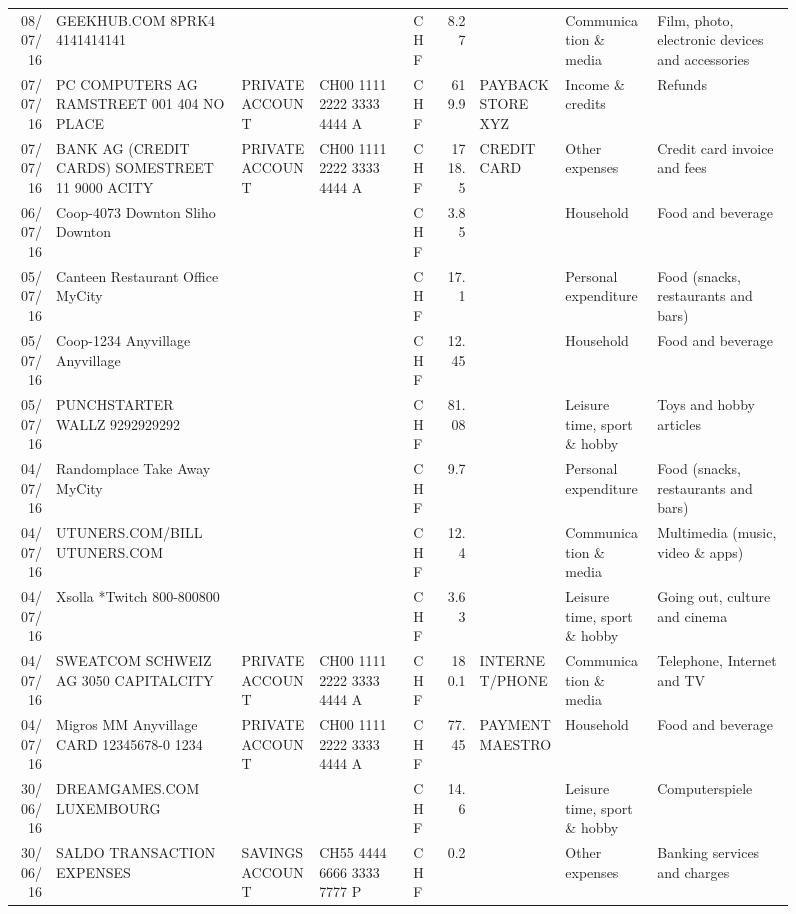 \begin{landscape}
\begin{sidewaysfigure}
\begin{table}[h]
\begin{center}
\begin{tabular}{rllllrlll}
		08/07/16 & GEEKHUB.COM  8PRK4        4141414141 &       &       & CHF   & 8.27  &       & Communication \& media & Film, photo, electronic devices and accessories \\
		07/07/16 & PC COMPUTERS AG RAMSTREET 001 404 NO PLACE & PRIVATE ACCOUNT & CH00 1111 2222 3333 4444 A & CHF   & 619.9 & PAYBACK STORE XYZ & Income \& credits & Refunds \\
		07/07/16 & BANK AG (CREDIT CARDS) SOMESTREET 11 9000 ACITY & PRIVATE ACCOUNT & CH00 1111 2222 3333 4444 A & CHF   & 1718.5 & CREDIT CARD & Other expenses & Credit card invoice and fees \\
		06/07/16 & Coop-4073 Downton Sliho   Downton &       &       & CHF   & 3.85  &       & Household & Food and beverage \\
		05/07/16 & Canteen Restaurant Office      MyCity &       &       & CHF   & 17.1  &       & Personal expenditure & Food (snacks, restaurants and bars) \\
		05/07/16 & Coop-1234 Anyvillage    Anyvillage &       &       & CHF   & 12.45 &       & Household & Food and beverage \\
		05/07/16 & PUNCHSTARTER WALLZ   9292929292 &       &       & CHF   & 81.08 &       & Leisure time, sport \& hobby & Toys and hobby articles \\
		04/07/16 & Randomplace Take Away     MyCity &       &       & CHF   & 9.7   &       & Personal expenditure & Food (snacks, restaurants and bars) \\
		04/07/16 & UTUNERS.COM/BILL          UTUNERS.COM &       &       & CHF   & 12.4  &       & Communication \& media & Multimedia (music, video \& apps) \\
		04/07/16 & Xsolla *Twitch           800-800800 &       &       & CHF   & 3.63  &       & Leisure time, sport \& hobby & Going out, culture and cinema \\
		04/07/16 & SWEATCOM SCHWEIZ AG 3050 CAPITALCITY & PRIVATE ACCOUNT & CH00 1111 2222 3333 4444 A & CHF   & 180.1 & INTERNET/PHONE & Communication \& media & Telephone,  Internet and TV \\
		04/07/16 & Migros MM Anyvillage CARD 12345678-0 1234 & PRIVATE ACCOUNT & CH00 1111 2222 3333 4444 A & CHF   & 77.45 & PAYMENT MAESTRO & Household & Food and beverage \\
		30/06/16 & DREAMGAMES.COM           LUXEMBOURG &       &       & CHF   & 14.6  &       & Leisure time, sport \& hobby & Computerspiele \\
		30/06/16 & SALDO TRANSACTION EXPENSES & SAVINGS ACCOUNT & CH55 4444 6666 3333 7777 P & CHF   & 0.2   &       & Other expenses & Banking services and charges \\

\end{tabular}
\end{center}
\end{table}
\end{sidewaysfigure}
\end{landscape}
